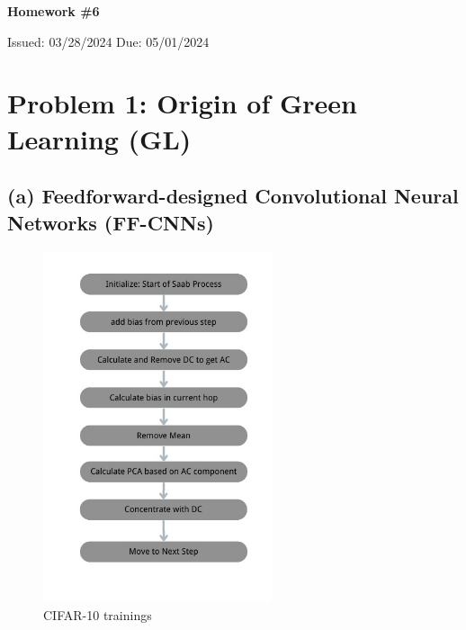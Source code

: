 \documentclass[12pt]{article}
\begin{document}
	
	\begin{center}
		\Large
		\textbf{Homework \#6}
		
		\vspace{0.2cm}
		\normalsize
		Issued: 03/28/2024 \hfill Due: 05/01/2024
	\end{center}
\section*{Problem 1: Origin of Green Learning (GL)}
\subsection*{(a) Feedforward-designed Convolutional Neural Networks (FF-CNNs)}
	\begin{figure}[H]
		\centering
		\includegraphics[width=0.6\textwidth]{saab.jpg}



	\caption{CIFAR-10 trainings}
	\label{p2b}
\end{figure}
\end{document}
